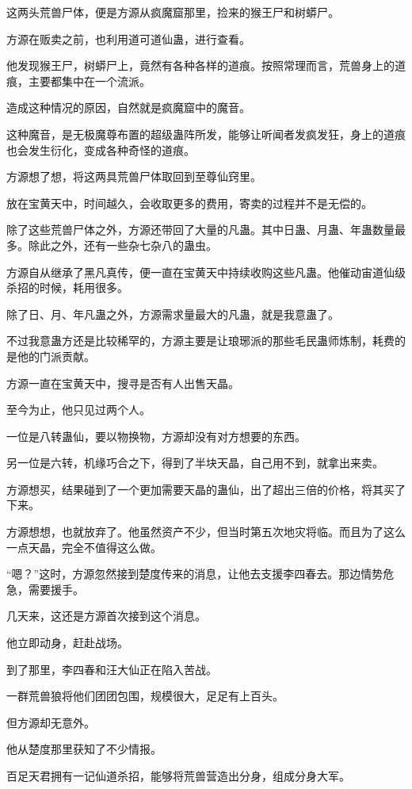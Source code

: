 \begin{this_body}
这两头荒兽尸体，便是方源从疯魔窟那里，捡来的猴王尸和树蟒尸。

方源在贩卖之前，也利用道可道仙蛊，进行查看。

他发现猴王尸，树蟒尸上，竟然有各种各样的道痕。按照常理而言，荒兽身上的道痕，主要都集中在一个流派。

造成这种情况的原因，自然就是疯魔窟中的魔音。

这种魔音，是无极魔尊布置的超级蛊阵所发，能够让听闻者发疯发狂，身上的道痕也会发生衍化，变成各种奇怪的道痕。

方源想了想，将这两具荒兽尸体取回到至尊仙窍里。

放在宝黄天中，时间越久，会收取更多的费用，寄卖的过程并不是无偿的。

除了这些荒兽尸体之外，方源还带回了大量的凡蛊。其中日蛊、月蛊、年蛊数量最多。除此之外，还有一些杂七杂八的蛊虫。

方源自从继承了黑凡真传，便一直在宝黄天中持续收购这些凡蛊。他催动宙道仙级杀招的时候，耗用很多。

除了日、月、年凡蛊之外，方源需求量最大的凡蛊，就是我意蛊了。

不过我意蛊方还是比较稀罕的，方源主要是让琅琊派的那些毛民蛊师炼制，耗费的是他的门派贡献。

方源一直在宝黄天中，搜寻是否有人出售天晶。

至今为止，他只见过两个人。

一位是八转蛊仙，要以物换物，方源却没有对方想要的东西。

另一位是六转，机缘巧合之下，得到了半块天晶，自己用不到，就拿出来卖。

方源想买，结果碰到了一个更加需要天晶的蛊仙，出了超出三倍的价格，将其买了下来。

方源想想，也就放弃了。他虽然资产不少，但当时第五次地灾将临。而且为了这么一点天晶，完全不值得这么做。

“嗯？”这时，方源忽然接到楚度传来的消息，让他去支援李四春去。那边情势危急，需要援手。

几天来，这还是方源首次接到这个消息。

他立即动身，赶赴战场。

到了那里，李四春和汪大仙正在陷入苦战。

一群荒兽狼将他们团团包围，规模很大，足足有上百头。

但方源却无意外。

他从楚度那里获知了不少情报。

百足天君拥有一记仙道杀招，能够将荒兽营造出分身，组成分身大军。


\end{this_body}
